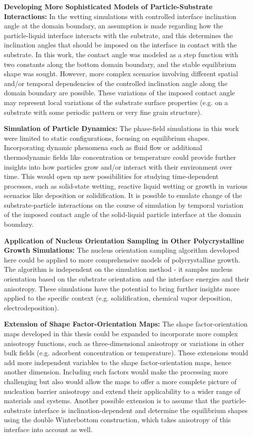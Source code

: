 \textbf{Developing More Sophisticated Models of Particle-Substrate Interactions:} In the wetting simulations with controlled interface inclination angle at the domain boundary, an assumption is made regarding how the particle-liquid interface interacts with the substrate, and this determines the inclination angles that should be imposed on the interface in contact with the substrate. In this work, the contact angle was modeled as a step function with two constants along the bottom domain boundary, and the stable equilibrium shape was sought. However, more complex scenarios involving different spatial and/or temporal dependencies of the controlled inclination angle along the domain boundary are possible. These variations of the imposed contact angle may represent local variations of the substrate surface properties (e.g. on a substrate with some periodic pattern or very fine grain structure). 

\textbf{Simulation of Particle Dynamics:} The phase-field simulations in this work were limited to static configurations, focusing on equilibrium shapes. Incorporating dynamic phenomena such as fluid flow or additional thermodynamic fields like concentration or temperature could provide further insights into how particles grow and/or interact with their environment over time. This would open up new possibilities for studying time-dependent processes, such as solid-state wetting, reactive liquid wetting or growth in various scenarios like deposition or solidification. It is possible to emulate change of the substrate-particle interactions on the course of simulation by temporal variation of the imposed contact angle of the solid-liquid particle interface at the domain boundary. 
	
\textbf{Application of Nucleus Orientation Sampling in Other Polycrystalline Growth Simulations:} The nucleus orientation sampling algorithm developed here could be applied to more comprehensive models of polycrystalline growth. The algorithm is independent on the simulation method - it samples nucleus orientation based on the substrate orientation and the interface energies and their anisotropy. These simulations have the potential to bring further insights more applied to the specific context (e.g. solidification, chemical vapor deposition, electrodeposition).

\textbf{Extension of Shape Factor-Orientation Maps:} The shape factor-orientation maps developed in this thesis could be expanded to incorporate more complex anisotropy functions, such as three-dimensional anisotropy or variations in other bulk fields (e.g. adsorbent concentration or temperature). These extensions would add more independent variables to the shape factor-orientation maps, hence another dimension. Including such factors would make the processing more challenging but also would allow the maps to offer a more complete picture of nucleation barrier anisotropy and extend their applicability to a wider range of materials and systems. Another possible extension is to assume that the particle-substrate interface is inclination-dependent and determine the equilibrium shapes using the double Winterbottom construction, which takes anisotropy of this interface into account as well. 



\cleardoublepage

